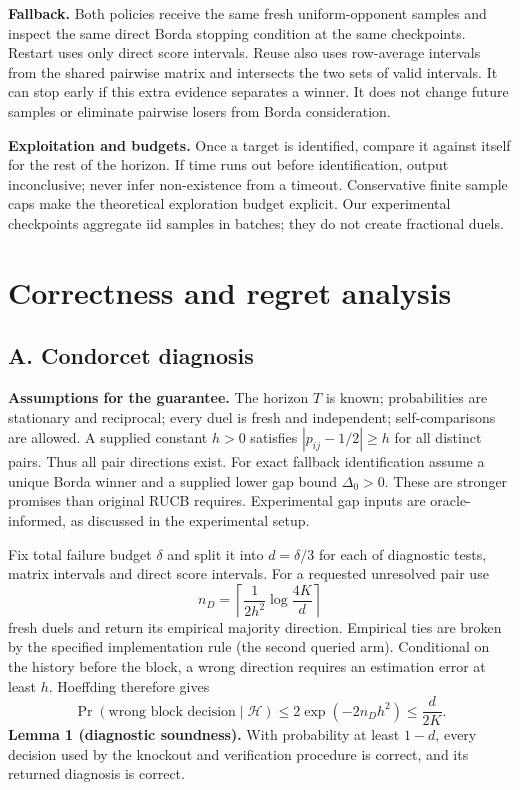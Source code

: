 \documentclass[11pt,a4paper]{article}
\begin{document}
\textbf{Fallback.} Both policies receive the same fresh uniform-opponent samples and inspect the same direct Borda stopping condition at the same checkpoints. Restart uses only direct score intervals. Reuse also uses row-average intervals from the shared pairwise matrix and intersects the two sets of valid intervals. It can stop early if this extra evidence separates a winner. It does not change future samples or eliminate pairwise losers from Borda consideration.

\textbf{Exploitation and budgets.} Once a target is identified, compare it against itself for the rest of the horizon. If time runs out before identification, output inconclusive; never infer non-existence from a timeout. Conservative finite sample caps make the theoretical exploration budget explicit. Our experimental checkpoints aggregate iid samples in batches; they do not create fractional duels.

\section{Correctness and regret analysis}
\subsection{A. Condorcet diagnosis}

\textbf{Assumptions for the guarantee.} The horizon $T$ is known; probabilities are stationary and reciprocal; every duel is fresh and independent; self-comparisons are allowed. A supplied constant $h>0$ satisfies $|p_{ij}-1/2|\ge h$ for all distinct pairs. Thus all pair directions exist. For exact fallback identification assume a unique Borda winner and a supplied lower gap bound $\Delta_0>0$. These are stronger promises than original RUCB requires. Experimental gap inputs are oracle-informed, as discussed in the experimental setup.

Fix total failure budget $\delta$ and split it into $d=\delta/3$ for each of diagnostic tests, matrix intervals and direct score intervals. For a requested unresolved pair use
\[
n_D=\left\lceil\frac{1}{2h^2}\log\frac{4K}{d}\right\rceil
\]
fresh duels and return its empirical majority direction. Empirical ties are broken by the specified implementation rule (the second queried arm). Conditional on the history before the block, a wrong direction requires an estimation error at least $h$. Hoeffding therefore gives
\[
\Pr(\text{wrong block decision}\mid\mathcal H)
\le2\exp(-2n_Dh^2)\le\frac{d}{2K}.
\]
\textbf{Lemma 1 (diagnostic soundness).} With probability at least $1-d$, every decision used by the knockout and verification procedure is correct, and its returned diagnosis is correct.
\end{document}
